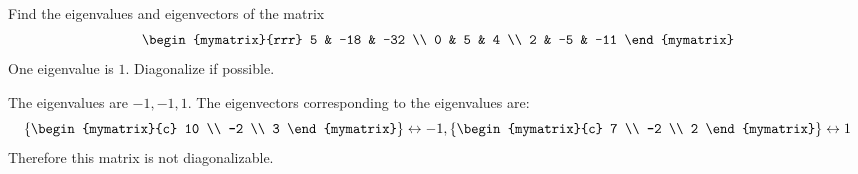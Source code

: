 \begin{enumialphparenastyle}

\begin{ex} Find the eigenvalues and eigenvectors of the matrix 
\begin{equation*}
\begin{mymatrix}{rrr}
5 & -18 & -32 \\
0 & 5 & 4 \\
2 & -5 & -11
\end{mymatrix}
\end{equation*}
One eigenvalue is $1$. Diagonalize if possible.
\begin{sol}
The eigenvalues are $-1, -1, 1$. The eigenvectors corresponding to the eigenvalues are:
\[
\set{\begin{mymatrix}{c}
10 \\
-2 \\
3
\end{mymatrix} } \leftrightarrow -1,  \set{\begin{mymatrix}{c}
7 \\
-2 \\
2
\end{mymatrix} } \leftrightarrow 1
\]
Therefore this matrix is not diagonalizable. 
\end{sol}
\end{ex}


\end{enumialphparenastyle}

